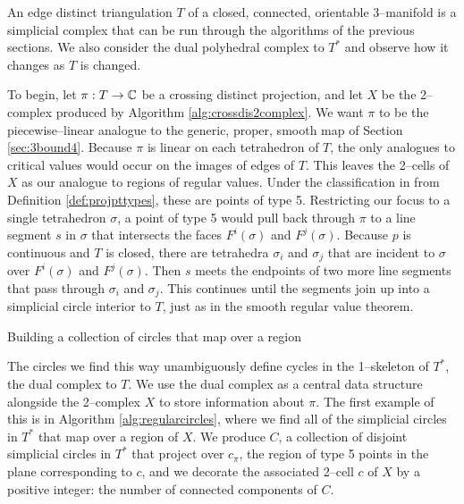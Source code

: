 An edge distinct triangulation $T$ of a closed, connected, orientable 3--manifold is a simplicial complex that can be run through the algorithms of the previous sections.
We also consider the dual polyhedral complex to $T^*$ and observe how it changes as $T$ is changed.

To begin, let $\pi:T\to\mathbb{C}$ be a crossing distinct projection, and let $X$ be the 2--complex produced by Algorithm \ref{alg:crossdis2complex}.
We want $\pi$ to be the piecewise--linear analogue to the generic, proper, smooth map of Section \ref{sec:3bound4}.
Because $\pi$ is linear on each tetrahedron of $T$, the only analogues to critical values would occur on the images of edges of $T$.
This leaves the 2--cells of $X$ as our analogue to regions of regular values.
Under the classification in from Definition \ref{def:projpttypes}, these are points of type 5.
Restricting our focus to a single tetrahedron $\sigma$, a point of type 5 would pull back through $\pi$ to a line segment $s$ in $\sigma$ that intersects the faces $F^i(\sigma)$ and $F^j(\sigma)$.
Because $p$ is continuous and $T$ is closed, there are tetrahedra $\sigma_i$ and $\sigma_j$ that are incident to $\sigma$ over $F^i(\sigma)$ and $F^j(\sigma)$.
Then $s$ meets the endpoints of two more line segments that pass through $\sigma_i$ and $\sigma_j$.
This continues until the segments join up into a simplicial circle interior to $T$, just as in the smooth regular value theorem.

\begin{algorithm}[h]
	\caption{Building a collection of circles that map over a region}
	\label{alg:regularcircles}
\end{algorithm}

The circles we find this way unambiguously define cycles in the 1--skeleton of $T^*$, the dual complex to $T$.
We use the dual complex as a central data structure alongside the 2--complex $X$ to store information about $\pi$.
The first example of this is in Algorithm \ref{alg:regularcircles}, where we find all of the simplicial circles in $T^*$ that map over a region of $X$.
We produce $C$, a collection of disjoint simplicial circles in $T^*$ that project over $c_\pi$, the region of type 5 points in the plane corresponding to $c$, and we decorate the associated 2--cell $c$ of $X$ by a positive integer: the number of connected components of $C$.

